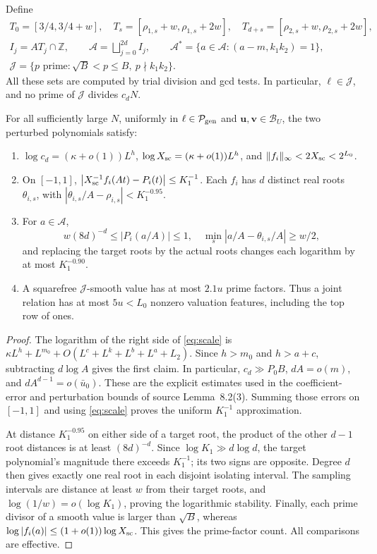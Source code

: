 Define
\begin{gather*}
 T_0=[3/4,3/4+w],\quad
 T_s=[\rho_{1,s}+w,\rho_{1,s}+2w],\quad
 T_{d+s}=[\rho_{2,s}+w,\rho_{2,s}+2w],\\
 I_j=AT_j\cap\mathbb Z,\qquad
 \mathcal A=\bigsqcup_{j=0}^{2d}I_j,\qquad
 \mathcal A^*=\{a\in\mathcal A:(a-m,k_1k_2)=1\},\\
 \mathcal J=\{p\text{ prime}:\sqrt B<p\le B,\ p\nmid k_1k_2\}.
\end{gather*}
All these sets are computed by trial division and gcd tests.  In
particular, \(\ell\in\mathcal J\), and no prime of \(\mathcal J\)
divides \(c_dN\).

\begin{lemma}\label{lem:construction}
For all sufficiently large \(N\), uniformly in \(\ell\in\mathcal
P_{\rm gen}\) and \(\mathbf u,\mathbf v\in\mathcal B_U\), the two
perturbed polynomials satisfy:
\begin{enumerate}[label=(\roman*)]
\item \(\log c_d=(\kappa+o(1))L^h\),
\(\log X_{\rm sc}=(\kappa+o(1))L^h\), and
\(\|f_i\|_\infty<2X_{\rm sc}<2^{L_0}\).
\item On \([-1,1]\),
\(\left|X_{\rm sc}^{-1}f_i(At)-P_i(t)\right|\le K_1^{-1}\).
Each \(f_i\) has \(d\) distinct real roots \(\theta_{i,s}\), with
\(\left|\theta_{i,s}/A-\rho_{i,s}\right|<K_1^{-0.95}\).
\item For \(a\in\mathcal A\),
\[
 w(8d)^{-d}\le |P_i(a/A)|\le1,
 \quad
 \min_s|a/A-\theta_{i,s}/A|\ge w/2,
\]
and replacing the target roots by the actual roots changes each
logarithm by at most \(K_1^{-0.90}\).
\item A squarefree \(\mathcal J\)-smooth value has at most \(2.1u\)
prime factors.  Thus a joint relation has at most \(5u<L_0\) nonzero
valuation features, including the top row of ones.
\end{enumerate}
\end{lemma}

\begin{proof}
The logarithm of the right side of \eqref{eq:scale} is
\(\kappa L^h+L^{m_0}+O(L^c+L^k+L^b+L^a+L_2)\).
Since \(h>m_0\) and \(h>a+c\), subtracting \(d\log A\) gives the
first claim.  In particular, \(c_d\gg P_0B\), \(dA=o(m)\), and
\(dA^{d-1}=o(\bar u_0)\).  These are the explicit estimates used in
the coefficient-error and perturbation bounds of source Lemma~8.2(3).
Summing those errors on \([-1,1]\) and using \eqref{eq:scale} proves
the uniform \(K_1^{-1}\) approximation.

At distance \(K_1^{-0.95}\) on either side of a target root, the product
of the other \(d-1\) root distances is at least \((8d)^{-d}\).
Since \(\log K_1\gg d\log d\), the target polynomial's magnitude
there exceeds \(K_1^{-1}\); its two signs are opposite.  Degree \(d\)
then gives exactly one real root in each disjoint isolating interval.
The sampling intervals are distance at least \(w\) from their target
roots, and \(\log(1/w)=o(\log K_1)\), proving the logarithmic
stability.  Finally, each prime divisor of a smooth value is larger
than \(\sqrt B\), whereas \(\log|f_i(a)|\le(1+o(1))\log X_{\rm sc}\).
This gives the prime-factor count.  All comparisons are effective.
\end{proof}

